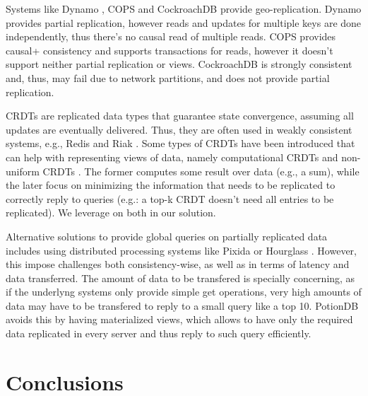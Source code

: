 \documentclass{vldb}
\begin{document}
Systems like Dynamo \cite{dynamo}, COPS \cite{cops} and CockroachDB \cite{cockroachdb} provide geo-replication.
Dynamo provides partial replication, however reads and updates for multiple keys are done independently, thus there's no causal read of multiple reads.
COPS provides causal+ consistency and supports transactions for reads, however it doesn't support neither partial replication or views.
CockroachDB is strongly consistent and, thus, may fail due to network partitions, and does not provide partial replication.
 
CRDTs \cite{crdt} are replicated data types that guarantee state convergence, assuming all updates are eventually delivered.
Thus, they are often used in weakly consistent systems, e.g., Redis \cite{redisCRDT} and Riak \cite{riak}.
Some types of CRDTs have been introduced that can help with representing views of data, namely computational CRDTs \cite{computationalCrdt} and non-uniform CRDTs \cite{Cabrita17Nonuniform}.
The former computes some result over data (e.g., a sum), while the later focus on minimizing the information that needs to be replicated to correctly reply to queries (e.g.: a top-k CRDT doesn't need all entries to be replicated).
We leverage on both in our solution.

Alternative solutions to provide global queries on partially replicated data includes using distributed processing systems like Pixida \cite{kloudas2015pixida} or Hourglass \cite{hourglass}.
However, this impose challenges both consistency-wise, as well as in terms of latency and data transferred.
The amount of data to be transfered is specially concerning, as if the underlyng systems only provide simple get operations, very high amounts of data may have to be transfered to reply to a small query like a top 10.
PotionDB avoids this by having materialized views, which allows to have only the required data replicated in every server and thus reply to such query efficiently.



\section{Conclusions}
\end{document}
